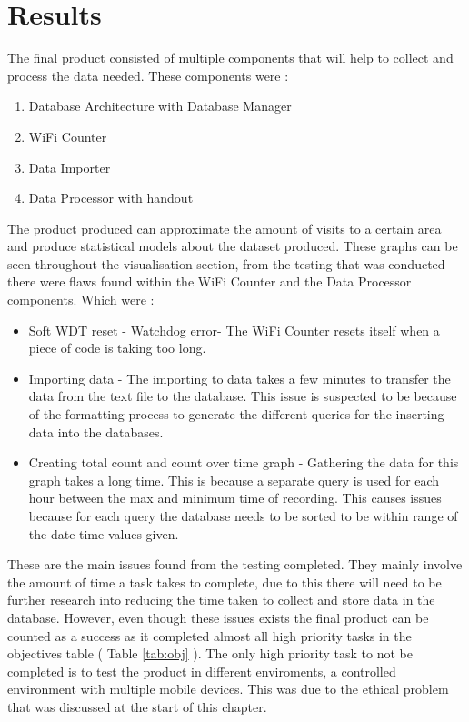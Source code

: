 \documentclass{report}
\begin{document}
\section{Results}
The final product consisted of multiple components that will help to collect and process the data needed. These components were :  
\begin{enumerate}
    \item Database Architecture with Database Manager
    \item WiFi Counter
    \item Data Importer
    \item Data Processor with handout 
\end{enumerate}
The product produced can approximate the amount of visits to a certain area and produce statistical models about the dataset produced. These graphs can be seen throughout the visualisation section, from the testing that was conducted there were flaws found within the WiFi Counter and the Data Processor components. Which were : 
\begin{itemize}
    \item Soft WDT reset - Watchdog error\cite{SoftWDTReset}- The WiFi Counter resets itself when a piece of code is taking too long. 
    \item Importing data - The importing to data takes a few minutes to transfer the data from the text file to the database. This issue is suspected to be because of the formatting process to generate the different queries for the inserting data into the databases.
    \item Creating total count and count over time graph -  Gathering the data for this graph takes a long time. This is because a separate query is used for each hour between the max and minimum time of recording. This causes issues because for each query the database needs to be sorted to be within range of the date time values given.
\end{itemize}{}
These are the main issues found from the testing completed. They mainly involve the amount of time a task takes to complete, due to this there will need to be further research into reducing the time taken to collect and store data in the database. However, even though these issues exists the final product can be counted as a success as it completed almost all high priority tasks in the objectives table ( Table \ref{tab:obj} ). The only high priority task to not be completed is to test the product in different enviroments, a controlled environment with multiple mobile devices. This was due to the ethical problem that was discussed at the start of this chapter. \\ \newline
\end{document}
